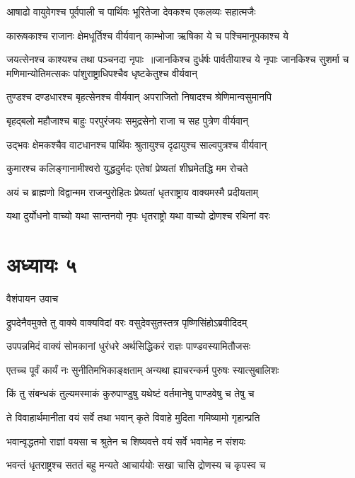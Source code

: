 \twolineshloka
{आषाढो वायुवेगश्च पूर्वपाली च पार्थिवः}
{भूरितेजा देवकश्च एकलव्यः सहात्मजैः}


\twolineshloka
{कारूषकाश्च राजानः क्षेमधूर्तिश्च वीर्यवान्}
{काम्भोजा ऋषिका ये च पश्चिमानूपकाश्च ये}


जयत्सेनश्च काश्यश्च तथा पञ्चनदा नृपाः ॥जानकिश्च दुर्धर्षः पार्वतीयाश्च ये नृपाः
\twolineshloka
{जानकिश्च सुशर्मा च मणिमान्योतिमत्सकः}
{पांशुराष्ट्राधिपश्चैव धृष्टकेतुश्च वीर्यवान्}


\twolineshloka
{तुण्डश्च दण्डधारश्च बृहत्सेनश्च वीर्यवान्}
{अपराजितो निषादश्च श्रेणिमान्वसुमानपि}


\twolineshloka
{बृहद्बलो महौजाश्च बाहुः परपुरंजयः}
{समुद्रसेनो राजा च सह पुत्रेण वीर्यवान्}


\twolineshloka
{उद्भवः क्षेमकश्चैव वाटधानश्च पार्थिवः}
{श्रुतायुश्च दृढायुश्च साल्वपुत्रश्च वीर्यवान्}


\twolineshloka
{कुमारश्च कलिङ्गानामीश्वरो युद्धदुर्मदः}
{एतेषां प्रेष्यतां शीघ्रमेतद्धि मम रोचते}


\twolineshloka
{अयं च ब्राह्मणो विद्वान्मम राजन्पुरोहितः}
{प्रेष्यतां धृतराष्ट्राय वाक्यमस्मै प्रदीयताम्}


\twolineshloka
{यथा दुर्योधनो वाच्यो यथा सान्तनवो नृपः}
{धृतराष्ट्रो यथा वाच्यो द्रोणश्च रथिनां वरः}


\chapter{अध्यायः ५}
\twolineshloka
{वैशंपायन उवाच}
{}


\twolineshloka
{द्रुपदेनैवमुक्ते तु वाक्ये वाक्यविदां वरः}
{वसुदेवसुतस्तत्र पृष्णिसिंहोऽब्रवीदिदम्}


\twolineshloka
{उपपन्नमिदं वाक्यं सोमकानां धुरंधरे}
{अर्थसिद्धिकरं राज्ञः पाण्डवस्यामितौजसः}


\twolineshloka
{एतच्च पूर्वं कार्यं नः सुनीतिमभिकाङ्क्षताम्}
{अन्यथा ह्याचरन्कर्म पुरुषः स्यात्सुबालिशः}


\twolineshloka
{किं तु संबन्धकं तुल्यमस्माकं कुरुपाण्डुषु}
{यथेष्टं वर्तमानेषु पाण्डवेषु च तेषु च}


\twolineshloka
{ते विवाहार्थमानीता वयं सर्वे तथा भवान्}
{कृते विवाहे मुदिता गमिष्यामो गृहान्प्रति}


\twolineshloka
{भवान्वृद्धतमो राज्ञां वयसा च श्रुतेन च}
{शिष्यवत्ते वयं सर्वे भवामेह न संशयः}


\twolineshloka
{भवन्तं धृतराष्ट्रश्च सततं बहु मन्यते}
{आचार्ययोः सखा चासि द्रोणस्य च कृपस्व च}


